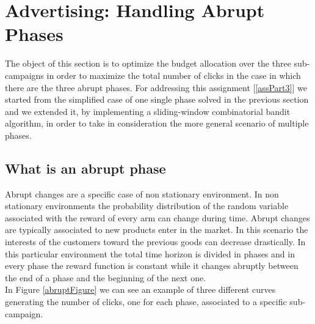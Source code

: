 \chapter{Advertising: Handling Abrupt Phases}

The object of this section is to optimize the budget allocation over the three sub-campaigns in order to maximize the total number of clicks in the case in which there are the three abrupt phases.
For addressing this assignment [\ref{assPart3}] we started from the simplified case of one single phase solved in the previous section and we extended it, by implementing a sliding-window combinatorial bandit algorithm, in order to take in consideration the more general scenario of multiple phases.\\

\section{What is an abrupt phase}
Abrupt changes are a specific case of non stationary environment.
In non stationary environments the probability distribution of the random variable associated with the reward of every arm can change during time.
Abrupt changes are typically associated to new products enter in the market. In this scenario the interests of the customers toward the previous goods can decrease drastically.
In this particular environment the total time horizon is divided in phases and in every phase the reward function is constant while it changes abruptly between the end of a phase and the beginning of the next one.\\ In Figure \ref{abruptFigure} we can see an example of three different curves generating  the number of clicks, one for each phase, associated to a specific sub-campaign.
